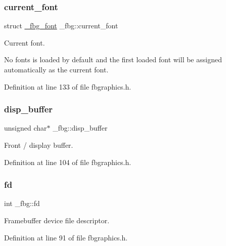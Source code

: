 \mbox{\label{struct__fbg_a72868d703236aaabb7a5031703a6bbd8}} 
\subsubsection{\texorpdfstring{current\+\_\+font}{current\_font}}
{\footnotesize\ttfamily struct \mbox{\hyperlink{fbgraphics_8h_struct__fbg__font}{\+\_\+fbg\+\_\+font}} \+\_\+fbg\+::current\+\_\+font}



Current font. 

No fonts is loaded by default and the first loaded font will be assigned automatically as the current font. 

Definition at line 133 of file fbgraphics.\+h.

\mbox{\label{struct__fbg_aa20614c94c7235bc5bc105b6e71e1be8}} 
\subsubsection{\texorpdfstring{disp\+\_\+buffer}{disp\_buffer}}
{\footnotesize\ttfamily unsigned char$\ast$ \+\_\+fbg\+::disp\+\_\+buffer}



Front / display buffer. 



Definition at line 104 of file fbgraphics.\+h.

\mbox{\label{struct__fbg_acfa58132f44f89e832ae7f73f5583b7e}} 
\subsubsection{\texorpdfstring{fd}{fd}}
{\footnotesize\ttfamily int \+\_\+fbg\+::fd}



Framebuffer device file descriptor. 



Definition at line 91 of file fbgraphics.\+h.

\mbox{\label{struct__fbg_ad3cac82bd9448a4020a4e08621f5269a}} 
